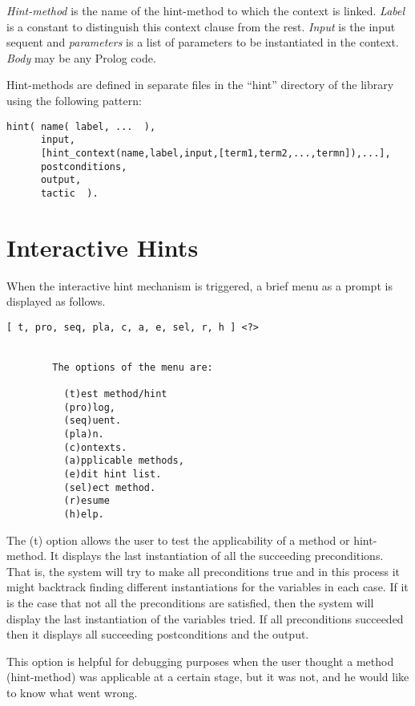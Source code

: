         {\em Hint-method} is the name of the hint-method to which the
context is linked. {\em Label} is a constant to distinguish this context
clause from the rest. {\em Input} is the input sequent and {\em
parameters} is a list of parameters to be instantiated in the context.
{\em Body} may be any Prolog code.

        Hint-methods are defined in separate files in the ``hint''
directory of the library using the following pattern:

\begin{verbatim}
hint( name( label, ...  ),
      input,
      [hint_context(name,label,input,[term1,term2,...,termn]),...],
      postconditions,
      output,
      tactic  ).
\end{verbatim}

\section{Interactive Hints}


        When the interactive hint mechanism is triggered, a brief menu
as a prompt is displayed as follows.

\begin{verbatim}
[ t, pro, seq, pla, c, a, e, sel, r, h ] <?> 


        The options of the menu are:

          (t)est method/hint
          (pro)log,
          (seq)uent.
          (pla)n.
          (c)ontexts.
          (a)pplicable methods,
          (e)dit hint list.
          (sel)ect method.
          (r)esume
          (h)elp.

\end{verbatim}

        The (t) option allows the user to test the applicability of a
method or hint-method. It displays the last instantiation of all the
succeeding preconditions. That is, the system will try to make all
preconditions true and in this process it might backtrack finding different
instantiations for the variables in each case. If it is the case that not
all the preconditions are satisfied, then the system will display the last
instantiation of the variables tried. If all preconditions succeeded
then it displays all succeeding postconditions and the output.

	This option is helpful for debugging purposes when the user thought
a method (hint-method) was applicable at a certain stage, but it was not,
and he would like to know what went wrong.

